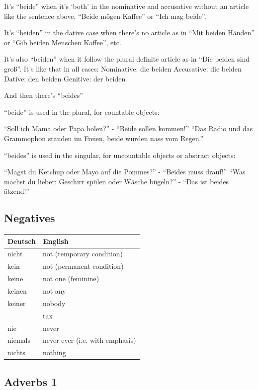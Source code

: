 It's ``beide'' when it's `both' in the nominative and accusative without an article like the sentence above, ``Beide m{\"o}gen Kaffee'' or ``Ich mag beide''.

It's ``beiden'' in the dative case when there's no article as in ``Mit beiden H{\"a}nden'' or ``Gib beiden Menschen Kaffee'', etc.

It's also ``beiden'' when it follow the plural definite article as in ``Die beiden sind groß''. It's like that in all cases: Nominative: die beiden Accusative: die beiden Dative: den beiden Genitive: der beiden

And then there's ``beides''

``beide'' is used in the plural, for countable objects:

``Soll ich Mama oder Papa holen?'' - ``Beide sollen kommen!'' ``Das Radio und das Grammophon standen im Freien, beide wurden nass vom Regen.''

``beides'' is used in the singular, for uncountable objects or abstract objects:

``Magst du Ketchup oder Mayo auf die Pommes?'' - ``Beides muss drauf!'' ``Was machst du lieber: Geschirr sp{\"u}len oder W{\"a}sche b{\"u}geln?'' - ``Das ist beides {\"a}tzend!''

\pagebreak
\subsection{Negatives}

\begin{center}\begin{tabular}{l|l}
  \textbf{Deutsch} & \textbf{English} \\
	\hline
	nicht & not (temporary condition) \\
	kein & not (permanent condition) \\
	keine & not one (feminine) \\
	keinen & not any \\
	keiner & nobody \\
	\Red{Die Steuer} & tax \\
	nie & never \\
	niemals & never ever (i.e. with emphasis) \\
	nichts & nothing \\
\end{tabular}\end{center}


\pagebreak
\subsection{Adverbs 1}

